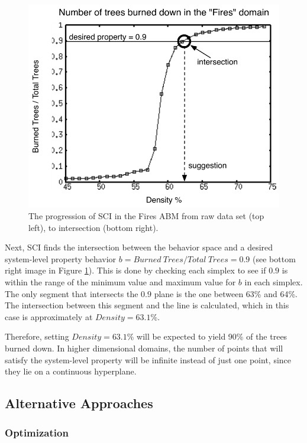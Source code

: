 \begin{figure}[ht]
\includegraphics[scale=.5]{images/rii5.pdf}
\caption{The progression of SCI in the Fires ABM from raw data set (top left), to intersection (bottom right). }
\label{fig:rii}
\end{figure}

Next, SCI finds the intersection between the behavior space and a desired system-level property behavior $b = Burned~{ }Trees / Total~{ }Trees = 0.9$ (see bottom right image in Figure \ref{fig:rii}).
This is done by checking each simplex to see if $0.9$ is within the range of the minimum value and maximum value for $b$ in each simplex.
The only segment that intersects the $0.9$ plane is the one between 63\% and 64\%.
The intersection between this segment and the line is calculated, which in this case is approximately at $Density = 63.1$\%.

Therefore, setting $Density = 63.1$\% will be expected to yield 90\% of the trees burned down.
In higher dimensional domains, the number of points that will satisfy the system-level property will be infinite instead of just one point, since they lie on a continuous hyperplane.

\subsection{Alternative Approaches}

   \subsubsection{Optimization}


